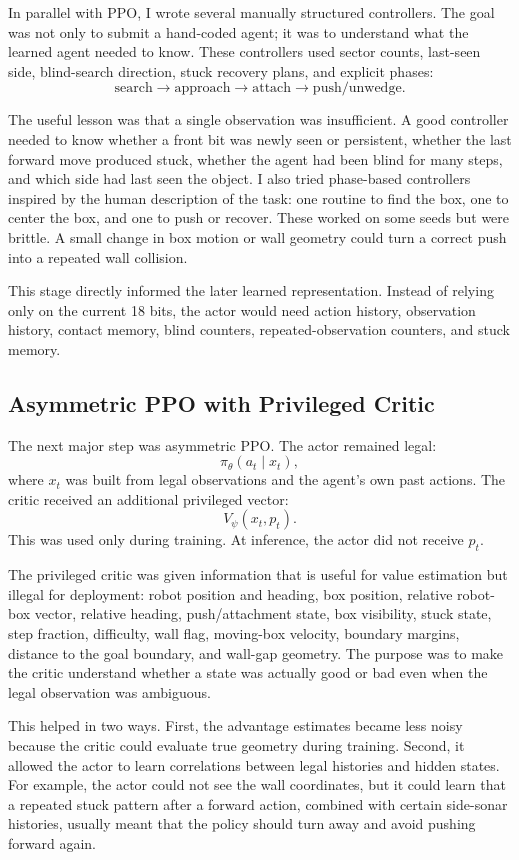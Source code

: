 \documentclass[11pt, oneside]{article}   	%
\begin{document}
In parallel with PPO, I wrote several manually structured controllers. The goal was not
only to submit a hand-coded agent; it was to understand what the learned agent needed to
know. These controllers used sector counts, last-seen side, blind-search direction,
stuck recovery plans, and explicit phases:
\[
  \text{search} \rightarrow \text{approach} \rightarrow \text{attach} \rightarrow \text{push/unwedge}.
\]

The useful lesson was that a single observation was insufficient. A good controller
needed to know whether a front bit was newly seen or persistent, whether the last
forward move produced stuck, whether the agent had been blind for many steps, and which
side had last seen the object. I also tried phase-based controllers inspired by the
human description of the task: one routine to find the box, one to center the box, and
one to push or recover. These worked on some seeds but were brittle. A small change in
box motion or wall geometry could turn a correct push into a repeated wall collision.

This stage directly informed the later learned representation. Instead of relying only
on the current 18 bits, the actor would need action history, observation history,
contact memory, blind counters, repeated-observation counters, and stuck memory.

\subsection{Asymmetric PPO with Privileged Critic}

The next major step was asymmetric PPO. The actor remained legal:
\[
  \pi_\theta(a_t\mid x_t),
\]
where \(x_t\) was built from legal observations and the agent's own past actions. The
critic received an additional privileged vector:
\[
  V_\psi(x_t,p_t).
\]
This was used only during training. At inference, the actor did not receive \(p_t\).

The privileged critic was given information that is useful for value estimation but
illegal for deployment: robot position and heading, box position, relative robot-box
vector, relative heading, push/attachment state, box visibility, stuck state, step
fraction, difficulty, wall flag, moving-box velocity, boundary margins, distance to the
goal boundary, and wall-gap geometry. The purpose was to make the critic understand
whether a state was actually good or bad even when the legal observation was ambiguous.

This helped in two ways. First, the advantage estimates became less noisy because the
critic could evaluate true geometry during training. Second, it allowed the actor to
learn correlations between legal histories and hidden states. For example, the actor
could not see the wall coordinates, but it could learn that a repeated stuck pattern
after a forward action, combined with certain side-sonar histories, usually meant that
the policy should turn away and avoid pushing forward again.
\end{document}
